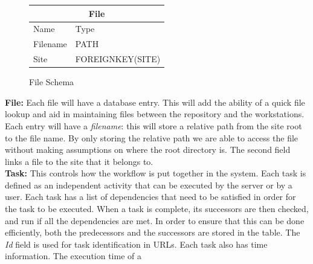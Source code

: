 \begin{figure}
\begin{tabular}{l|l}
    \multicolumn{2}{c}{File} \\
    \hline
    Name        & Type \\
    \hline
    Filename    & PATH  \\
    Site        & FOREIGNKEY(SITE)  \\
\end{tabular}
\caption{File Schema}
\end{figure}
\noindent\textbf{File:} Each file will have a database entry.
This will add the ability of a quick file lookup and aid in maintaining files between the
repository and the workstations. Each entry will have a \emph{filename}: this will store
a relative path from the site root to the file name. By only storing the relative path
we are able to access the file without making assumptions on where the root directory
is. The second field links a file to the site that it belongs to.
\\

\noindent \textbf{Task:} This controls how the workflow is put together in the system.
Each task is defined as an independent activity that can be executed by the server or
by a user. Each task has a list of dependencies that need to be satisfied in order
for the task to be executed. When a task is complete, its successors are then checked,
and run if all the dependencies are met. In order to ensure that this can be
done efficiently,
both the predecessors and the successors are stored in the table. The \emph{Id} field is
used for task identification in URLs. Each task also has time information. The execution
time of a

